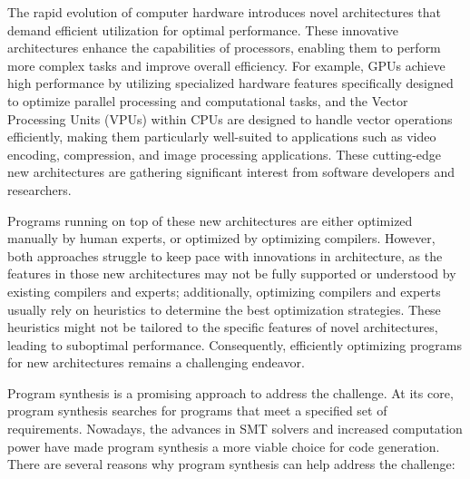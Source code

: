 



The rapid evolution of computer hardware introduces novel
architectures that demand efficient utilization for optimal performance.
These innovative architectures enhance the capabilities of processors,
enabling them to perform more complex tasks and improve overall efficiency.
%
For example, GPUs achieve high performance by utilizing specialized hardware
features specifically designed to optimize parallel processing and
computational tasks, and the Vector Processing Units (VPUs) within CPUs
are designed to handle vector operations efficiently,
making them particularly well-suited to applications
 such as video encoding, compression,
and image processing applications.
%
These cutting-edge new architectures are gathering significant interest
from software developers and researchers.

Programs running on top of these new architectures are either
optimized manually by human experts, or optimized by optimizing compilers.
However, both approaches struggle to keep pace
with innovations in architecture, as
the features in those new architectures may not be fully supported
or understood by existing compilers and experts;
%
additionally, optimizing compilers and experts usually rely on heuristics
to determine the best optimization strategies.
%
These heuristics might not be tailored to the specific features
of novel architectures, leading to suboptimal performance.
%
Consequently, efficiently optimizing programs for new architectures remains
a challenging endeavor.

Program synthesis is a promising approach to address the challenge.
%
At its core, program synthesis searches for programs
that meet a specified set of requirements.
%
Nowadays, the advances in SMT solvers and increased computation power
have made program synthesis a more viable choice for code generation.
%
There are several reasons why program synthesis can help address the challenge:

